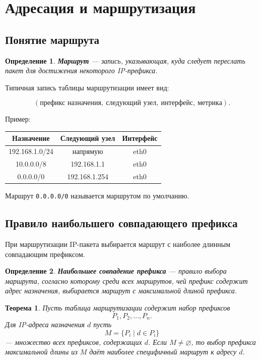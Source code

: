 \documentclass[12pt,a4paper]{article}
\newtheorem{definition}{Определение}
\newtheorem{theorem}{Теорема}
\begin{document}
\section{Адресация и маршрутизация}

\subsection{Понятие маршрута}

\begin{definition}
\textbf{Маршрут} --- запись, указывающая, куда следует переслать пакет для достижения некоторого IP-префикса.
\end{definition}

Типичная запись таблицы маршрутизации имеет вид:

\[
(\text{префикс назначения},\ \text{следующий узел},\ \text{интерфейс},\ \text{метрика}).
\]

Пример:

\begin{center}
\begin{tabular}{|c|c|c|}
\hline
\textbf{Назначение} & \textbf{Следующий узел} & \textbf{Интерфейс} \\
\hline
192.168.1.0/24 & напрямую & eth0 \\
\hline
10.0.0.0/8 & 192.168.1.1 & eth0 \\
\hline
0.0.0.0/0 & 192.168.1.254 & eth0 \\
\hline
\end{tabular}
\end{center}

Маршрут \texttt{0.0.0.0/0} называется маршрутом по умолчанию.

\subsection{Правило наибольшего совпадающего префикса}

При маршрутизации IP-пакета выбирается маршрут с наиболее длинным совпадающим префиксом.

\begin{definition}
\textbf{Наибольшее совпадение префикса} --- правило выбора маршрута, согласно которому среди всех маршрутов, чей префикс содержит адрес назначения, выбирается маршрут с максимальной длиной префикса.
\end{definition}

\begin{theorem}
Пусть таблица маршрутизации содержит набор префиксов
\[
P_1, P_2, \ldots, P_n.
\]
Для IP-адреса назначения $d$ пусть
\[
M = \{P_i \mid d \in P_i\}
\]
--- множество всех префиксов, содержащих $d$. Если $M \neq \varnothing$, то выбор префикса максимальной длины из $M$ даёт наиболее специфичный маршрут к адресу $d$.
\end{theorem}
\end{document}
